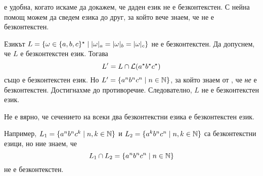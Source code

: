  е удобна, когато искаме да докажем, че даден език не е безконтекстен.
С нейна помощ можем да сведем езика до друг, за който вече знаем, че не е безконтекстен.

\begin{example}
  Езикът $L = \{\omega \in \{a,b,c\}^\star \mid \vert{\omega}\vert_{a} = \vert{\omega}\vert_{b} = \vert{\omega}\vert_{c}\}$ не е безконтекстен.
  Да допуснем, че $L$ е безконтекстен език.
  Тогава \[L^\prime = L \cap \mathcal{L}(a^\star b^\star c^\star)\] също е безконтекстен език.
  Но $L^\prime = \{a^nb^nc^n \mid n \in \mathbb{N}\}$, за който знаем от , че {\em не} е безконтекстен.
  Достигнахме до противоречие. Следователно, $L$ не е безконтекстен език.
\end{example}

\begin{important}
  \begin{remark}
    Не е вярно, че сечението на всеки два безконтекстни езика е безконтекстен език.

    Например, $L_1 = \{a^nb^nc^k \mid n,k\in\mathbb{N}\}$ и $L_2 = \{a^kb^nc^n \mid n,k\in\mathbb{N}\}$
    са безконтекстни езици, но ние знаем, че
    \[L_1 \cap L_2 = \{a^nb^nc^n \mid n \in \mathbb{N}\}\]
    не е безконтекстен.
  \end{remark}
\end{important}

